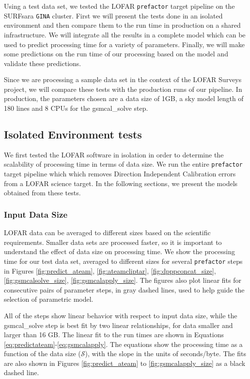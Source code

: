 \documentclass[preprint,5p]{elsarticle}
\begin{document}
Using a test data set, we tested the LOFAR \texttt{prefactor} target pipeline on the SURFsara \texttt{GINA} cluster. First we will present the tests done in an isolated environment and then compare them to the run time in production on a shared infrastructure. We will integrate all the results in a complete model which can be used to predict processing time for a variety of parameters. Finally, we will make some predictions on the run time of our processing based on the model and validate these predictions. 

Since we are  processing a sample data set in the context of the LOFAR Surveys project, we will compare these tests with the production runs of our pipeline. In production, the parameters chosen are a data size of 1GB, a sky model length of 180 lines and 8 CPUs for the gsmcal\_solve step. 
 

\subsection{Isolated Environment tests}
We first tested the LOFAR software in isolation in order to determine the scalability of processing time in terms of data size. We run the entire \texttt{prefactor} target pipeline which which removes Direction Independent Calibration errors from a LOFAR science target. In the following sections, we present the models obtained from these tests.  

\subsubsection{Input Data Size}\label{sec:results_size}
LOFAR data can be averaged to different sizes based on the scientific requirements. Smaller data sets are processed faster, so it is important to understand the effect of data size on processing time. We show the processing time for our test data set, averaged to different sizes for several \texttt{prefactor} steps in Figures \ref{fig:predict_ateam}, \ref{fig:ateamcliptar}, \ref{fig:dpppconcat_size}, \ref{fig:gsmcalsolve_size}, \ref{fig:gsmcalapply_size}. The figures also plot linear fits for consecutive pairs of parameter steps, in gray dashed lines, used to help guide the selection of parametric model. 

All of the steps show linear behavior with respect to input data size, while the gsmcal\_solve step is best fit by two linear relationships, for data smaller and larger than 16 GB. The linear fit to the run times are shown in Equations \ref{eq:predictateam}-\ref{eq:gsmcalapply}. The equations show the processing time as a function of the data size ($\mathcal{S}$), with the slope in the units of seconds/byte. The fits are also shown in Figures \ref{fig:predict_ateam} to \ref{fig:gsmcalapply_size} as a black dashed line.
\end{document}
